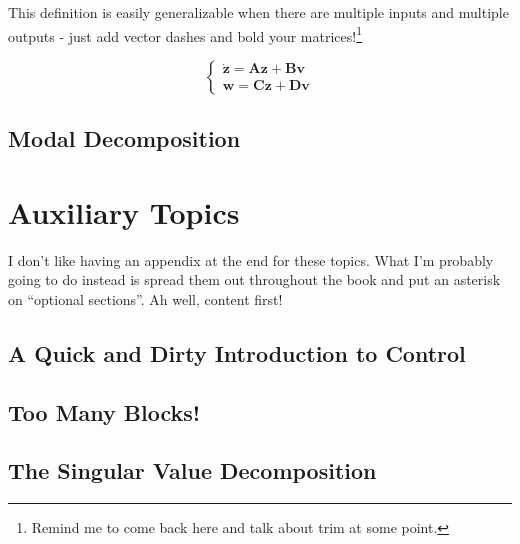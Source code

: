 \documentclass[
  letterpaper,
  DIV=11,
  numbers=noendperiod]{scrreprt}
\begin{document}
This definition is easily generalizable when there are multiple inputs
and multiple outputs - just add vector dashes and bold your
matrices!\footnote{Remind me to come back here and talk about trim at
  some point.}

\begin{equation*}
    \begin{cases}
        \dot{\boldsymbol{z}} = \textbf{A}\boldsymbol{z} + \textbf{B}\boldsymbol{v} \\
        \boldsymbol{w} = \textbf{C}\boldsymbol{z} + \textbf{D}\boldsymbol{v}
    \end{cases}
\end{equation*}

\hypertarget{modal-decomposition}{%
\section{Modal Decomposition}\label{modal-decomposition}}


\hypertarget{auxiliary-topics}{%
\chapter{Auxiliary Topics}\label{auxiliary-topics}}

I don't like having an appendix at the end for these topics. What I'm
probably going to do instead is spread them out throughout the book and
put an asterisk on ``optional sections''. Ah well, content first!

\hypertarget{a-quick-and-dirty-introduction-to-control}{%
\section{A Quick and Dirty Introduction to
Control}\label{a-quick-and-dirty-introduction-to-control}}

\hypertarget{too-many-blocks}{%
\section{Too Many Blocks!}\label{too-many-blocks}}

\hypertarget{the-singular-value-decomposition}{%
\section{The Singular Value
Decomposition}\label{the-singular-value-decomposition}}
\end{document}
